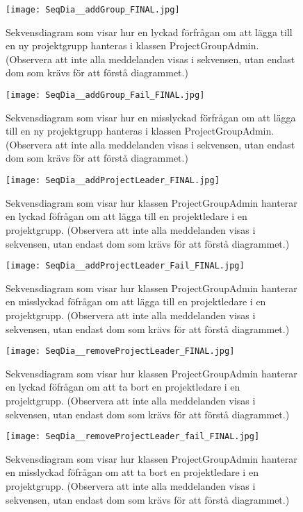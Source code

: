 \documentclass[a4paper]{article}
\begin{document}
\begin{figure}[h!]
\centering
\texttt{[image: SeqDia\_\_addGroup\_FINAL.jpg]}
\caption{Sekvensdiagram som visar hur en lyckad förfrågan om att lägga till en ny projektgrupp hanteras i klassen ProjectGroupAdmin. (Observera att inte alla meddelanden visas i sekvensen, utan endast dom som krävs för att förstå diagrammet.) \label{addGroup}}
\end{figure}

\begin{figure}[h!]
\centering
\texttt{[image: SeqDia\_\_addGroup\_Fail\_FINAL.jpg]}
\caption{Sekvensdiagram som visar hur en misslyckad förfrågan om att lägga till en ny projektgrupp hanteras i klassen ProjectGroupAdmin. (Observera att inte alla meddelanden visas i sekvensen, utan endast dom som krävs för att förstå diagrammet.) \label{addGroupFail}}
\end{figure}

\begin{figure}[h!]
\centering
\texttt{[image: SeqDia\_\_addProjectLeader\_FINAL.jpg]}
\caption{Sekvensdiagram som visar hur klassen ProjectGroupAdmin hanterar en lyckad föfrågan om att lägga till en projektledare i en projektgrupp. (Observera att inte alla meddelanden visas i sekvensen, utan endast dom som krävs för att förstå diagrammet.) \label{addProjectLeader}}
\end{figure}

\begin{figure}[h!]
\centering
\texttt{[image: SeqDia\_\_addProjectLeader\_Fail\_FINAL.jpg]}
\caption{Sekvensdiagram som visar hur klassen ProjectGroupAdmin hanterar en misslyckad föfrågan om att lägga till en projektledare i en projektgrupp. (Observera att inte alla meddelanden visas i sekvensen, utan endast dom som krävs för att förstå diagrammet.) \label{addProjectLeaderFail}}
\end{figure}

\begin{figure}[h!]
\centering
\texttt{[image: SeqDia\_\_removeProjectLeader\_FINAL.jpg]}
\caption{Sekvensdiagram som visar hur klassen ProjectGroupAdmin hanterar en lyckad föfrågan om att ta bort en projektledare i en projektgrupp. (Observera att inte alla meddelanden visas i sekvensen, utan endast dom som krävs för att förstå diagrammet.) \label{removeProjectLeader}}
\end{figure}

\begin{figure}[h!]
\centering
\texttt{[image: SeqDia\_\_removeProjectLeader\_fail\_FINAL.jpg]}
\caption{Sekvensdiagram som visar hur klassen ProjectGroupAdmin hanterar en misslyckad föfrågan om att ta bort en projektledare i en projektgrupp. (Observera att inte alla meddelanden visas i sekvensen, utan endast dom som krävs för att förstå diagrammet.) \label{removeProjectLeaderFail}}
\end{figure}
\end{document}
